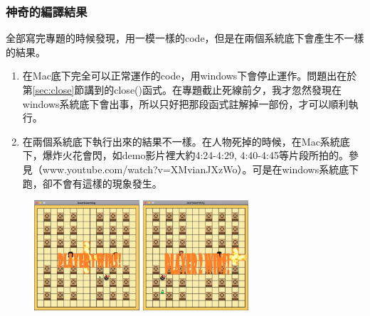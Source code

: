 \documentclass[a4paper]{article}
\theoremstyle{mystyle}	%
\begin{document}
\subsubsection{神奇的編譯結果}
全部寫完專題的時候發現，用一模一樣的code，但是在兩個系統底下會產生不一樣的結果。
\begin{enumerate}
\item 在Mac底下完全可以正常運作的code，用windows下會停止運作。問題出在於第{\color{blue}\ref{sec:close}}節講到的{\codefont \small close()}函式。在專題截止死線前夕，我才忽然發現在windows系統底下會出事，所以只好把那段函式註解掉一部份，才可以順利執行。
\item 在兩個系統底下執行出來的結果不一樣。在人物死掉的時候，在Mac系統底下，爆炸火花會閃，如demo影片裡大約4:24-4:29, 4:40-4:45等片段所拍的。參見（{\color{blue}www.youtube.com/watch?v=XMvianJXzWo}）。可是在windows系統底下跑，卻不會有這樣的現象發生。
\end{enumerate}
\begin{figure}[ht]
\begin{center}
\graphicspath{{project_image/}}
\includegraphics[width=0.35\textwidth]{player1win.png}
\hspace{2.5em}
\includegraphics[width=0.35\textwidth]{player2win.png}
\end{center}
\end{figure}







\end{document}
